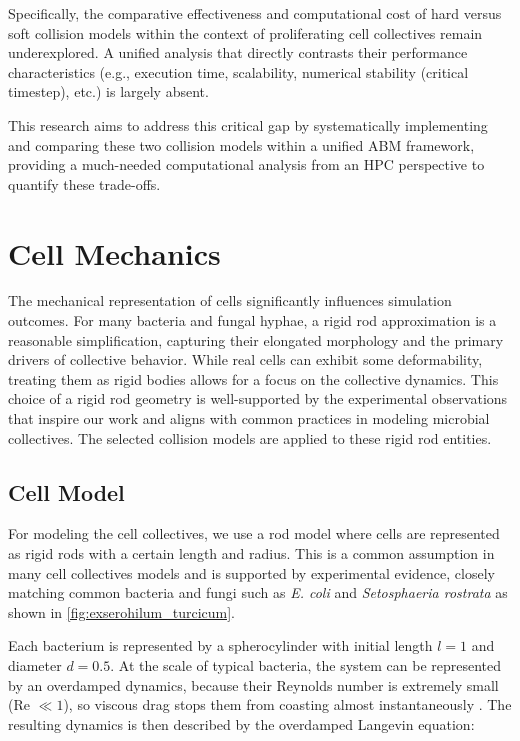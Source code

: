 \documentclass[conference]{IEEEtran}
\begin{document}
Specifically, the comparative effectiveness and computational cost of hard versus soft collision models within the context of proliferating cell collectives remain underexplored. A unified analysis that directly contrasts their performance characteristics (e.g., execution time, scalability, numerical stability (critical timestep), etc.) is largely absent.

This research aims to address this critical gap by systematically implementing and comparing these two collision models within a unified ABM framework, providing a much-needed computational analysis from an HPC perspective to quantify these trade-offs.

\section{Cell Mechanics}

The mechanical representation of cells significantly influences simulation outcomes. For many bacteria and fungal hyphae, a rigid rod approximation is a reasonable simplification, capturing their elongated morphology and the primary drivers of collective behavior. While real cells can exhibit some deformability, treating them as rigid bodies allows for a focus on the collective dynamics. This choice of a rigid rod geometry is well-supported by the experimental observations that inspire our work and aligns with common practices in modeling microbial collectives. The selected collision models are applied to these rigid rod entities.

\subsection{Cell Model}

For modeling the cell collectives, we use a rod model where cells are represented as rigid rods with a certain length and radius. This is a common assumption in many cell collectives models \cite{You2018}\cite{Weady2024}\cite{Blanchard2015}\cite{Warren2019}\cite{Ghosh2015} and is supported by experimental evidence, closely matching common bacteria and fungi such as \textit{E. coli} and \textit{Setosphaeria rostrata} as shown in \autoref{fig:exserohilum_turcicum}.


Each bacterium is represented by a spherocylinder with initial length $l=1$ and diameter $d=0.5$. At the scale of typical bacteria, the system can be represented by an overdamped dynamics, because their Reynolds number is extremely small (Re $\ll 1$), so viscous drag stops them from coasting almost instantaneously \cite{datta2024lifelowreynoldsnumber}. The resulting dynamics is then described by the overdamped Langevin equation:
\end{document}
